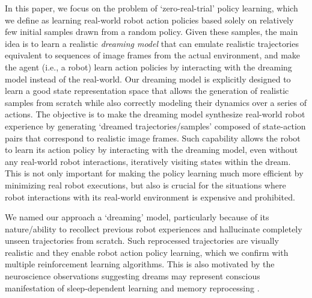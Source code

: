 \documentclass[letterpaper, 10 pt, conference]{ieeeconf}
\begin{document}
In this paper, we focus on the problem of `zero-real-trial' policy learning, which we define as learning real-world robot action policies based solely on relatively few initial samples drawn from a random policy.
Given these samples, the main idea is to learn a realistic \emph{dreaming model} that can emulate realistic trajectories equivalent to sequences of image frames from the actual environment, and make the agent (i.e., a robot) learn action policies by interacting with the dreaming model instead of the real-world. 
Our dreaming model is explicitly designed to learn a good state representation space that allows the generation of realistic samples from scratch while also correctly modeling their dynamics over a series of actions.
The objective is to make the dreaming model synthesize real-world robot experience by generating `dreamed trajectories/samples' composed of state-action pairs that correspond to realistic image frames. Such capability allows the robot to learn its action policy by interacting with the dreaming model, even without any real-world robot interactions, iteratively visiting states within the dream. This is not only important for making the policy learning much more efficient by minimizing real robot executions, but also is crucial for the situations where robot interactions with its real-world environment is expensive and prohibited.

We named our approach a `dreaming' model, particularly because of its nature/ability to recollect previous robot experiences and hallucinate completely unseen trajectories from scratch.
Such reprocessed trajectories are visually realistic and they enable robot action policy learning, which we confirm with multiple reinforcement learning algorithms. This is also motivated by the neuroscience observations suggesting dreams may represent conscious manifestation of sleep-dependent learning and memory reprocessing \cite{stickgold2001sleep}.
\end{document}
